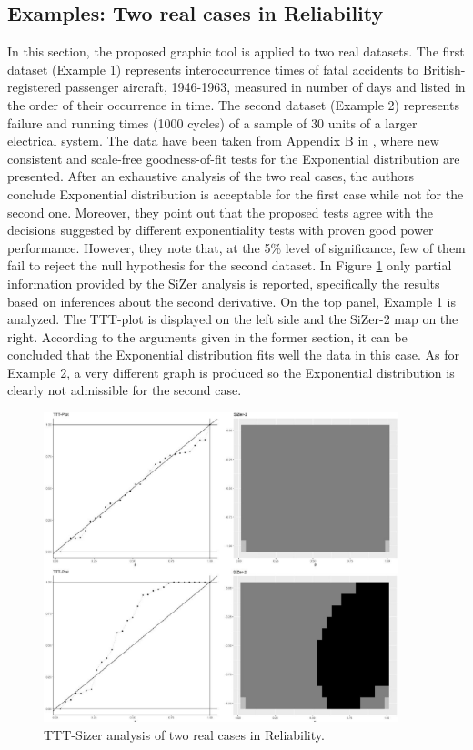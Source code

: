 \documentclass[preprint,12pt]{elsarticle}
\begin{document}
\subsection{Examples: Two real cases in Reliability}
In this section, the proposed graphic tool is applied to two real datasets. The first dataset (Example 1) represents interoccurrence
times of fatal accidents to British-registered passenger aircraft, 1946-1963, measured in number of days and listed in the order of their occurrence in time. The second dataset (Example 2) represents failure and running times (1000 cycles) of a sample of 30 units of a larger electrical system. The data have been taken from Appendix B in \cite{CMO2019}, where new consistent and scale-free goodness-of-fit tests for the Exponential distribution are presented. After an exhaustive analysis of the two real cases, the
authors conclude Exponential distribution is acceptable for the first case while not for the second one. Moreover, they point out that the proposed tests agree with the decisions suggested by different exponentiality tests with proven good power performance. However, they note that, at the 5\% level of significance, few of them fail to reject the null hypothesis for the second dataset.
In Figure \ref{Fig:2reliab_data} only partial information  provided by the SiZer analysis is reported, specifically the results based on inferences about the second derivative. On the top panel,  Example 1 is analyzed. The TTT-plot is displayed on the left side and the SiZer-2 map on the right. According to the arguments given in the former section, it can be concluded that the Exponential distribution fits well the data in this case. 
As for Example 2, a very different graph is produced so the Exponential distribution is clearly not admissible for the second case.

\begin{figure}[htb]
\begin{center}
\includegraphics[height=9cm]{Fig3_twosamplestogether}
\caption{TTT-Sizer analysis of two real cases in Reliability.}\label{Fig:2reliab_data}
\end{center}
\end{figure}
\end{document}
